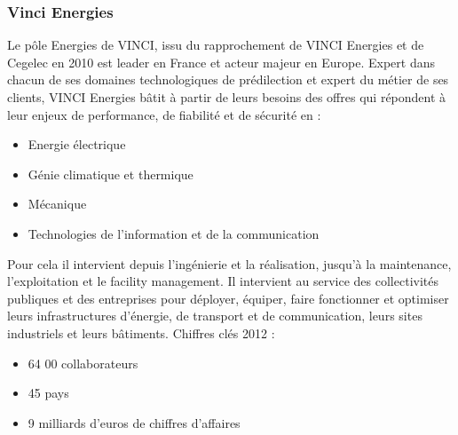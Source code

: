 \subsubsection{Vinci Energies}
	Le pôle Energies de VINCI, issu du rapprochement de VINCI Energies et de Cegelec en 2010 est leader en France et acteur majeur en Europe. 
	Expert dans chacun de ses domaines technologiques de prédilection et expert du métier de ses clients, VINCI Energies bâtit à partir de leurs besoins des offres qui répondent à leur enjeux de performance, de fiabilité et de sécurité en :
\begin{itemize}
	\item Energie électrique
	\item Génie climatique et thermique
	\item Mécanique
	\item Technologies de l'information et de la communication
\end{itemize}
\bigbreak
	Pour cela il intervient depuis l'ingénierie et la réalisation, jusqu'à la maintenance, l'exploitation et le facility management. Il intervient au service des collectivités publiques et des entreprises pour déployer, équiper, faire fonctionner et optimiser leurs infrastructures d'énergie, de transport et de communication, leurs sites industriels et leurs bâtiments.
\newpage
Chiffres clés 2012 :
\begin{itemize}
	\item 64 00 collaborateurs
	\item 45 pays
	\item 9 milliards d'euros de chiffres d'affaires
\end{itemize}

